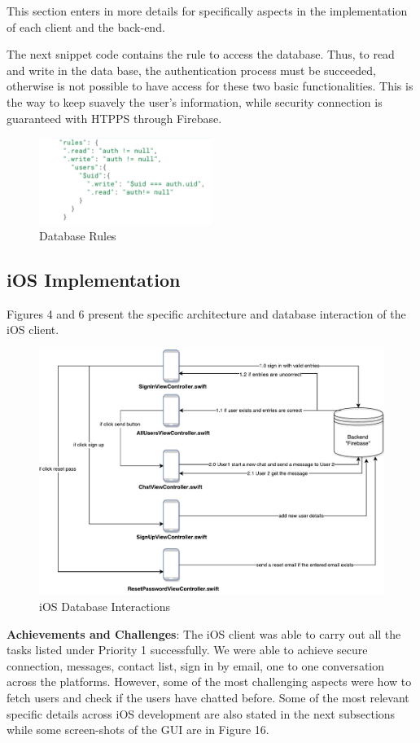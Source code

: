 This section enters in more details for specifically aspects in the implementation of each client and the back-end.

The next snippet code contains the rule to access the database.  Thus, to read and write in the data base, the authentication process must be succeeded, otherwise is not possible to have access for these two basic functionalities. This is the way to keep suavely the user's information, while security connection is guaranteed with HTPPS through Firebase.

\begin{figure}[ht]
\centering
\includegraphics[width=0.5\textwidth]{figs/databaserules}
	\caption{Database Rules}
	\label{fig:databaserules}
\end{figure}

\subsection{iOS Implementation}

Figures 4 and 6 present the specific architecture and database interaction of the iOS client.

\begin{figure}[ht]
\centering
\includegraphics[width=1\textwidth]{figs/iOSarchitecture}
	\caption{iOS Database Interactions}
	\label{fig:iOSarchitecture}
\end{figure}
\textbf{Achievements and Challenges}: The iOS client was able to carry out all the tasks listed under Priority 1 successfully. We were able to achieve secure connection, messages, contact list, sign in by email, one to one conversation across the platforms. However, some of the most challenging aspects were how to fetch users and check if the users have chatted before. Some of the most relevant specific details across iOS development are also stated in the next subsections while some screen-shots of the GUI are in Figure 16. 

